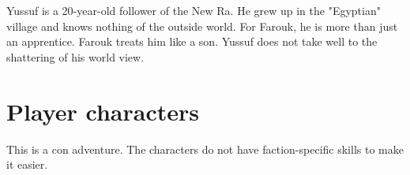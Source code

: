 \begin{npcBox}[title=Yussuf]
    \begin{stressSection}
    \end{stressSection}
    \begin{tabularx}{\textwidth}{ XX }
    \end{tabularx}

    \begin{consequences}
    \item {}
    \item {}
    \item {}
    \end{consequences}

    \begin{npcDescription}
    Yussuf is a 20-year-old follower of the New Ra. He grew up in the "Egyptian" village and knows nothing of the outside world. For Farouk, he is more than just an apprentice. Farouk treats him like a son. Yussuf does not take well to the shattering of his world view.
    \end{npcDescription}

\end{npcBox}

\newpage

\section{Player characters}

This is a con adventure. The characters do not have faction-specific skills to make it easier.
\newpage

